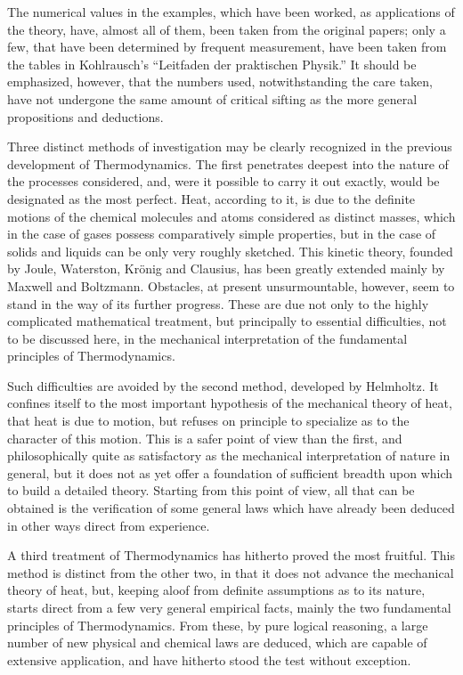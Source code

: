 \documentclass[12pt]{book}[2005/09/16]
\newcommand{\PageSep}[1]{\ignorespaces}
\begin{document}
The numerical values in the examples, which have been
worked, as applications of the theory, have, almost all of
them, been taken from the original papers; only a few,
that have been determined by frequent measurement, have
been taken from the tables in Kohlrausch's ``Leitfaden der
praktischen Physik.'' It should be emphasized, however,
that the numbers used, notwithstanding the care taken,
have not undergone the same amount of critical sifting
as the more general propositions and deductions.
\bigskip

Three distinct methods of investigation may be clearly
recognized in the previous development of Thermodynamics.
The first penetrates deepest into the nature of the processes
considered, and, were it possible to carry it out exactly,
would be designated as the most perfect. Heat, according
to it, is due to the definite motions of the chemical
molecules and atoms considered as distinct masses, which
in the case of gases possess comparatively simple properties,
but in the case of solids and liquids can be only very
roughly sketched. This kinetic theory, founded by Joule,
Waterston, Krönig and Clausius, has been greatly extended
mainly by Maxwell and Boltzmann. Obstacles, at present
unsurmountable, however, seem to stand in the way of its
further progress. These are due not only to the highly
complicated mathematical treatment, but principally to
essential difficulties, not to be discussed here, in the
mechanical interpretation of the fundamental principles of
Thermodynamics.
\PageSep{ix}

Such difficulties are avoided by the second method,
developed by Helmholtz. It confines itself to the most
important hypothesis of the mechanical theory of heat,
that heat is due to motion, but refuses on principle to
specialize as to the character of this motion. This is a
safer point of view than the first, and philosophically quite
as satisfactory as the mechanical interpretation of nature
in general, but it does not as yet offer a foundation of
sufficient breadth upon which to build a detailed theory.
Starting from this point of view, all that can be obtained
is the verification of some general laws which have already
been deduced in other ways direct from experience.

A third treatment of Thermodynamics has hitherto
proved the most fruitful. This method is distinct from
the other two, in that it does not advance the mechanical
theory of heat, but, keeping aloof from definite assumptions
as to its nature, starts direct from a few very general
empirical facts, mainly the two fundamental principles of
Thermodynamics. From these, by pure logical reasoning,
a large number of new physical and chemical laws are
deduced, which are capable of extensive application, and
have hitherto stood the test without exception.
\end{document}
